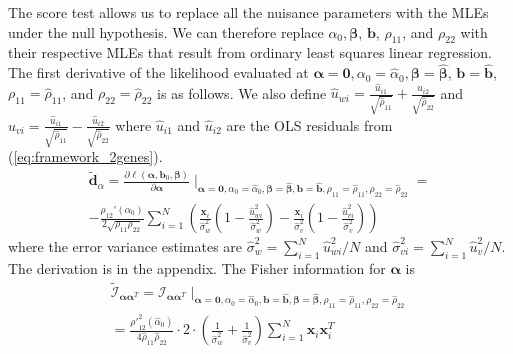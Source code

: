 \documentclass[aap,authoryear, preprint]{imsart}
\numberwithin{equation}{section}
\theoremstyle{plain}
\begin{document}
The score test allows us to replace all the nuisance parameters with the MLEs under the null hypothesis. We can therefore replace $\alpha_0, \bm{\beta}$, $\bm{b}$, $\rho_{11}$, and $\rho_{22}$ with their respective MLEs that result from ordinary least squares linear regression. The first derivative of the likelihood evaluated at $\bm{\alpha}=\bm{0}, \alpha_0 = \hat{\alpha}_0, \bm{\beta} = \bm{\hat{\beta}}$, $\bm{b} = \bm{\hat{b}}$, $\rho_{11} = \hat{\rho}_{11}$, and $\rho_{22} = \hat{\rho}_{22}$ is as follows. We also define $\hat{u}_{wi} = \frac{\hat{u}_{i1}}{\sqrt{\hat{\rho}_{11}}} +  \frac{\hat{u}_{i2}}{\sqrt{\hat{\rho}_{22}}}$ and $\hat{u}_{vi} = \frac{\hat{u}_{i1}}{\sqrt{\hat{\rho}_{11}}} -  \frac{\hat{u}_{i2}}{\sqrt{\hat{\rho}_{22}}}$ where $\hat{u}_{i1}$ and $\hat{u}_{i2}$ are the OLS residuals from (\ref{eq:framework_2genes}).
\begin{equation}
\begin{multlined}
\bm{\tilde{d}}_{\alpha} = \frac{\partial \ell(\bm{\alpha}, \bm{b}_0, \bm{\beta})} {\partial \bm{\alpha}}\mid_{\bm{\alpha}=\bm{0}, \alpha_0 = \hat{\alpha}_0, \bm{\beta} = \bm{\hat{\beta}}, \bm{b} = \bm{\hat{b}}, \rho_{11} = \hat{\rho}_{11}, \rho_{22} = \hat{\rho}_{22}} =\\
-\frac{\rho_{12}'(\alpha_0)}{2\sqrt{\rho_{11}\rho_{22}}} \sum_{i=1}^{N} \left(
    \frac{\bm{x}_i}{\hat{\sigma}_{w}^2} 
    \left( 1-\frac{\hat{u}_{wi}^2}{\hat{\sigma}_{w}^2}\right) - 
    \frac{\bm{x}_i}{\hat{\sigma}_{v}^2} 
    \left( 1-\frac{\hat{u}_{vi}^2}{\hat{\sigma}_{v}^2}\right) 
    \right)
\end{multlined}
\label{first_derivative}
\end{equation}
where the error variance estimates are $\hat{\sigma}_w^2 = \sum_{i=1}^{N} \hat{u}_{wi}^2/N$ and $\hat{\sigma}_{vi}^2 = \sum_{i=1}^{N}\hat{u}_v^2/N$. The derivation is in the appendix. The Fisher information for $\bm{\alpha}$ is
\begin{equation}
\begin{multlined}
        \tilde{\mathcal{I}}_{\bm{\alpha}\bm{\alpha}^T} = \mathcal{I}_{\bm{\alpha}\bm{\alpha}^T}\mid_{
        \bm{\alpha}=\bm{0}, 
        \alpha_0 = \hat{\alpha}_0,
        \bm{b} = \bm{\hat{b}},
        \bm{\beta} = \bm{\hat{\beta}},
        {\rho}_{11} = \hat{\rho}_{11},
        {\rho}_{22} = \hat{\rho}_{22}}\\
        = \frac{{\rho'}^2_{12}(\hat{\alpha}_0)}{4\hat{\rho}_{11}\hat{\rho}_{22}}\cdot 2 \cdot \left(\frac{1}{\hat{\sigma}_{w}^2} +  \frac{1}{\hat{\sigma}_{v}^2}\right) \sum_{i=1}^{N} \bm{x}_i \bm{x}_i^T
    \end{multlined}
\end{equation}
\end{document}
